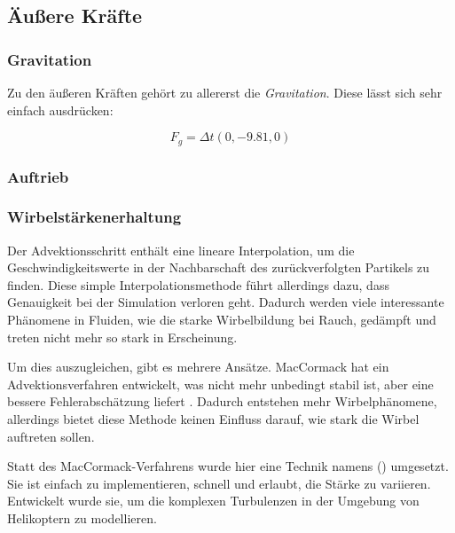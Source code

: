 \subsection{Äußere Kräfte}

\subsubsection{Gravitation}

Zu den äußeren Kräften gehört zu allererst die \emph{Gravitation}. Diese lässt
sich sehr einfach ausdrücken:

\begin{equation}
F_g = \Delta t (0,-9.81,0)
\end{equation}

\subsubsection{Auftrieb}

\label{sec:stam_buoyancy}


\subsubsection{Wirbelstärkenerhaltung}

Der Advektionsschritt enthält eine lineare Interpolation, um die
Geschwindigkeitswerte in der Nachbarschaft des zurückverfolgten Partikels zu
finden. Diese simple Interpolationsmethode führt allerdings dazu, dass
Genauigkeit bei der Simulation verloren geht. Dadurch werden viele interessante
Phänomene in Fluiden, wie die starke Wirbelbildung bei Rauch, gedämpft und
treten nicht mehr so stark in Erscheinung.

Um dies auszugleichen, gibt es mehrere Ansätze. MacCormack hat ein
Advektionsverfahren entwickelt, was nicht mehr unbedingt stabil ist, aber eine
bessere Fehlerabschätzung liefert \cite{Selle2008}\cite{Crane2007}. Dadurch
entstehen mehr Wirbelphänomene, allerdings bietet diese Methode keinen Einfluss
darauf, wie stark die Wirbel auftreten sollen.

Statt des MacCormack-Verfahrens wurde hier eine Technik namens
 () umgesetzt. Sie ist einfach zu implementieren, schnell und
erlaubt, die Stärke zu variieren. Entwickelt wurde sie, um die komplexen
Turbulenzen in der Umgebung von Helikoptern zu modellieren\cite{Steinhoff1994}.

